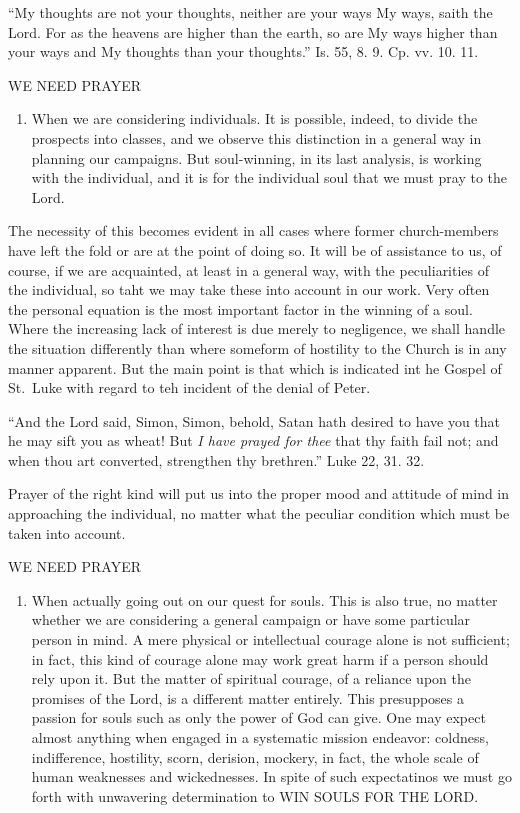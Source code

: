 \documentclass[
]{book}
\providecommand{\tightlist}{%
  \setlength{\itemsep}{0pt}\setlength{\parskip}{0pt}}
\begin{document}
``My thoughts are not your thoughts, neither are your ways My ways, saith the Lord. For as the heavens are higher than the earth, so are My ways higher than your ways and My thoughts than your thoughts.'' Is. 55, 8. 9. Cp. vv. 10. 11.

WE NEED PRAYER

\begin{enumerate}
\def\labelenumi{\alph{enumi}.}
\setcounter{enumi}{1}
\tightlist
\item
  When we are considering individuals. It is possible, indeed, to divide the prospects into classes, and we observe this distinction in a general way in planning our campaigns. But soul-winning, in its last analysis, is working with the individual, and it is for the individual soul that we must pray to the Lord.
\end{enumerate}

The necessity of this becomes evident in all cases where former church-members have left the fold or are at the point of doing so. It will be of assistance to us, of course, if we are acquainted, at least in a general way, with the peculiarities of the individual, so taht we may take these into account in our work. Very often the personal equation is the most important factor in the winning of a soul. Where the increasing lack of interest is due merely to negligence, we shall handle the situation differently than where someform of hostility to the Church is in any manner apparent. But the main point is that which is indicated int he Gospel of St.~Luke with regard to teh incident of the denial of Peter.

``And the Lord said, Simon, Simon, behold, Satan hath desired to have you that he may sift you as wheat! But \emph{I have prayed for thee} that thy faith fail not; and when thou art converted, strengthen thy brethren.'' Luke 22, 31. 32.

Prayer of the right kind will put us into the proper mood and attitude of mind in approaching the individual, no matter what the peculiar condition which must be taken into account.

WE NEED PRAYER

\begin{enumerate}
\def\labelenumi{\alph{enumi}.}
\setcounter{enumi}{2}
\tightlist
\item
  When actually going out on our quest for souls. This is also true, no matter whether we are considering a general campaign or have some particular person in mind. A mere physical or intellectual courage alone is not sufficient; in fact, this kind of courage alone may work great harm if a person should rely upon it. But the matter of spiritual courage, of a reliance upon the promises of the Lord, is a different matter entirely. This presupposes a passion for souls such as only the power of God can give. One may expect almost anything when engaged in a systematic mission endeavor: coldness, indifference, hostility, scorn, derision, mockery, in fact, the whole scale of human weaknesses and wickednesses. In spite of such expectatinos we must go forth with unwavering determination to WIN SOULS FOR THE LORD.
\end{enumerate}
\end{document}
